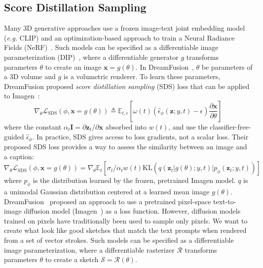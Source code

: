 \documentclass{article}
\begin{document}
\subsection{Score Distillation Sampling}

Many 3D generative approaches use a frozen image-text joint embedding model (\textit{e.g.} CLIP) and an optimization-based approach to train a Neural Radiance Fields (NeRF)~\cite{nerf_mildenhall_2021}.
Such models can be specified as a differentiable image parameterization (DIP)~\cite{differentiable_mordvintsev_2018}, where a differentiable generator $g$ transforms parameters $\theta$ to create an image $\mathbf{x} = g(\theta)$.
In DreamFusion~\cite{poole_2023_dreamfusion}, $\theta$ be parameters of a 3D volume and $g$ is a volumetric renderer.
To learn these parameters, DreamFusion proposed \textit{score distillation sampling} (SDS) loss that can be applied to Imagen~\cite{imagen_2022_saharia}:
\begin{equation}
\nabla_{\theta} \mathcal{L}_{\mathrm{SDS}} (\phi, \mathbf{x}=g(\theta)) \triangleq \mathbb{E}_{t,\epsilon} \left[ 
\omega(t) (\hat{\epsilon}_{\phi}(\mathbf{z};y,t) - \epsilon) 
\frac{\partial \mathbf{x}}{\partial \theta}
\right]
\end{equation}
where the constant $\alpha_t \mathbf{I} = \partial \mathbf{z}_t / \partial \mathbf{x}$ absorbed into $w(t)$, and use the classifier-free-guided $\hat{\epsilon}_{\phi}$.
In practice, SDS gives access to loss gradients, not a scalar loss. Their proposed SDS loss provides a way to assess the similarity between an image and a caption:
\begin{equation}
\nabla_{\theta} \mathcal{L}_{\mathrm{SDS}}(\phi, \mathbf{x}=g(\theta))
=
\nabla_{\theta} \mathbb{E}_{t} \left[
\sigma_{t} / \alpha_{t} w(t) 
\mathrm{KL}
\left(
q\left(\mathbf{z}_{t} | g(\theta) ; y, t\right)|p_{\phi}\left(\mathbf{z}_{t} ; y, t\right)
\right)
\right]
\end{equation}
where $p_{\phi}$ is the distribution learned by the frozen, pretrained Imagen model. $q$ is a unimodal Gaussian distribution centered at a learned mean image $g(\theta)$.
DreamFusion~\cite{poole_2023_dreamfusion} proposed an approach to use a pretrained pixel-space text-to-image diffusion model (Imagen~\cite{imagen_2022_saharia}) as a loss function. However, diffusion models trained on pixels have traditionally been used to sample only pixels.
We want to create what look like good sketches that match the text prompts when rendered from a set of vector strokes.
Such models can be specified as a differentiable image parameterization, where a differentiable rasterizer $\mathcal{R}$ transforms parameters $\theta$ to create a sketch $\mathcal{S} = \mathcal{R}(\theta)$.
\end{document}
